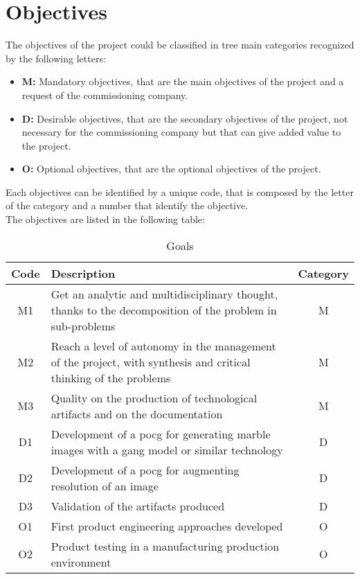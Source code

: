 \section{Objectives}
The objectives of the project could be classified in tree main categories recognized by the following letters:
\begin{itemize}
    \item\textbf{M:} Mandatory objectives, that are the main objectives of the project and a request of the commissioning company.
    \item\textbf{D:} Desirable objectives, that are the secondary objectives of the project, not necessary
    for the commissioning company but that can give added value to the project.
    \item\textbf{O:} Optional objectives, that are the optional objectives of the project.
\end{itemize}
Each objectives can be identified by a unique code, that is composed by the letter of the category and a number that identify the objective.\\
The objectives are listed in the following table:
\begin{table}[H]
    \caption{Goals}\label{tab:goals}
    \centering
    \begin{tabularx}{\textwidth}{|c|X|c|}
        \hline
        \textbf{Code} & \textbf{Description} & \textbf{Category}\\
        \hline
        M1 & Get an analytic and multidisciplinary thought, thanks to the decomposition of the problem in sub-problems & M\\
        \hline
        M2 & Reach a level of autonomy in the management of the project, with synthesis and critical thinking of the problems & M\\
        \hline
        M3 & Quality on the production of technological artifacts and on the documentation & M\\
        \hline
        D1 & Development of a \gls{pocg} for generating marble images with a \gls{gang} model or similar technology & D\\
        \hline
        D2 & Development of a \gls{pocg} for augmenting resolution of an image & D\\
        \hline
        D3 & Validation of the artifacts produced & D\\
        \hline
        O1 & First product engineering approaches developed & O\\
        \hline
        O2 & Product testing in a manufacturing production environment & O\\
        \hline
    \end{tabularx}
\end{table}
